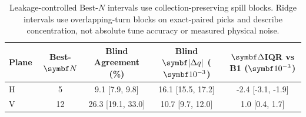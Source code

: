\begin{table}[!htb]
  \centering
  \caption{Leakage-controlled Best-$N$ intervals use collection-preserving spill blocks. Ridge intervals use overlapping-turn blocks on exact-paired picks and describe concentration, not absolute tune accuracy or measured physical noise.}
  \label{tab:results}
  \small
  \begin{tabular}{@{}lcccc@{}}
    \toprule
    \textbf{Plane} & \textbf{Best-$\tablemathbold{N}$} & \textbf{Blind Agreement (\%)} & \textbf{Blind $\tablemathbold{|\Delta q|}$ ($\tablemathbold{10^{-3}}$)} & \textbf{$\tablemathbold{\Delta}$IQR vs B1 ($\tablemathbold{10^{-3}}$)} \\
    \midrule
    H & 5 & 9.1 [7.9, 9.8] & 16.1 [15.5, 17.2] & -2.4 [-3.1, -1.9] \\
    V & 12 & 26.3 [19.1, 33.0] & 10.7 [9.7, 12.0] & 1.0 [0.4, 1.7] \\
    \bottomrule
  \end{tabular}
\end{table}
